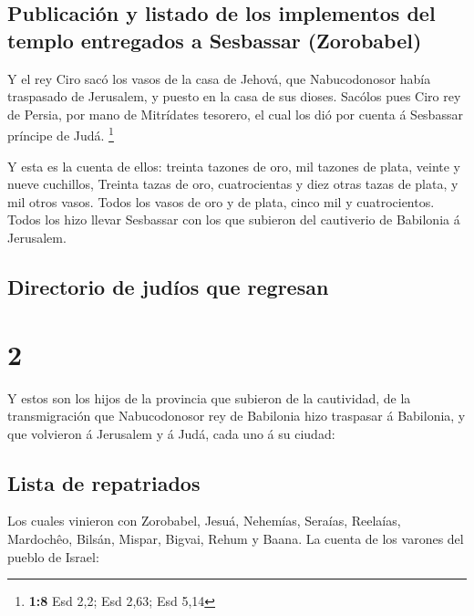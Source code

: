 \hypertarget{publicaciuxf3n-y-listado-de-los-implementos-del-templo-entregados-a-sesbassar-zorobabel}{%
\subsection{Publicación y listado de los implementos del templo
entregados a Sesbassar
(Zorobabel)}\label{publicaciuxf3n-y-listado-de-los-implementos-del-templo-entregados-a-sesbassar-zorobabel}}

 Y el rey Ciro sacó los vasos de la casa de Jehová, que
Nabucodonosor había traspasado de Jerusalem, y puesto en la casa de sus
dioses.  Sacólos pues Ciro rey de Persia, por mano de
Mitrídates tesorero, el cual los dió por cuenta á Sesbassar príncipe de
Judá. \footnote{\textbf{1:8} Esd 2,2; Esd 2,63; Esd 5,14}

 Y esta es la cuenta de ellos: treinta tazones de oro, mil
tazones de plata, veinte y nueve cuchillos,  Treinta tazas
de oro, cuatrocientas y diez otras tazas de plata, y mil otros vasos.
 Todos los vasos de oro y de plata, cinco mil y
cuatrocientos. Todos los hizo llevar Sesbassar con los que subieron del
cautiverio de Babilonia á Jerusalem.

\hypertarget{directorio-de-juduxedos-que-regresan}{%
\subsection{Directorio de judíos que
regresan}\label{directorio-de-juduxedos-que-regresan}}

\hypertarget{section-1}{%
\section{2}\label{section-1}}

 Y estos son los hijos de la provincia que subieron de la
cautividad, de la transmigración que Nabucodonosor rey de Babilonia hizo
traspasar á Babilonia, y que volvieron á Jerusalem y á Judá, cada uno á
su ciudad:

\hypertarget{lista-de-repatriados}{%
\subsection{Lista de repatriados}\label{lista-de-repatriados}}

 Los cuales vinieron con Zorobabel, Jesuá, Nehemías,
Seraías, Reelaías, Mardochêo, Bilsán, Mispar, Bigvai, Rehum y Baana. La
cuenta de los varones del pueblo de Israel:


